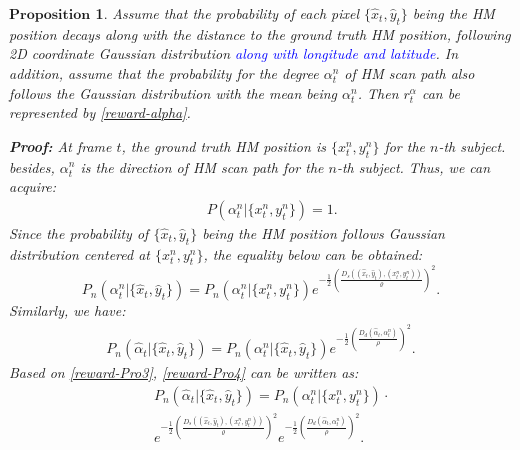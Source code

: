 \documentclass[10pt,journal,compsoc]{IEEEtran}
\newtheorem{proposition}[theorem]{$\textbf{Proposition}$}
\begin{document}
\begin{proposition}
    \label{lemma3}
    Assume that the probability of each pixel $\{\hat{x}_{t},\hat{y}_{t}\}$ being the HM position decays along with the distance to the ground truth HM position, following 2D coordinate Gaussian distribution \textcolor{blue}{along with longitude and latitude}.
    In addition, assume that the probability for the degree $\alpha^{n}_{t}$ of HM scan path also follows the Gaussian distribution with the mean being $\alpha^{n}_{t}$.
    Then $r^{\alpha}_t$ can be represented by \eqref{reward-alpha}.

    \textbf{Proof:} At frame $t$, the ground truth HM position is $\{x^{n}_{t},y^{n}_{t} \}$ for  the $n$-th subject.
    besides, $\alpha^{n}_{t}$ is the direction of HM scan path for the $n$-th subject.
    Thus, we can acquire:
    \begin{eqnarray}
        \label{reward-Pro1}
        && P(\alpha^{n}_{t}|\{x^{n}_{t}, y^{n}_{t}\}) = 1.
    \end{eqnarray}
    Since the probability of $\{\hat{x}_{t},\hat{y}_{t}\}$ being the HM position follows Gaussian distribution centered at $\{x^{n}_{t},y^{n}_{t} \}$, the equality below can be obtained:
    \begin{equation}
        \label{reward-Pro3}
        P_{n}(\alpha^{n}_{t}|\{\hat{x}_{t},\hat{y}_{t}\}) = P_{n}(\alpha^{n}_{t}|\{x^{n}_{t}, y^{n}_{t}\}) e^{-\frac{1}{2}\left(\frac{D_s((\hat{x}_{t},\hat{y}_{t}),(x^n_{t},y^n_{t}))}{\varrho}\right)^2}.
    \end{equation}
    Similarly, we have:
    \begin{eqnarray}
        \label{reward-Pro4}
        P_{n}(\hat{\alpha}_{t}|\{\hat{x}_{t},\hat{y}_{t}\}) = P_{n}(\alpha^{n}_{t}|\{\hat{x}_{t},\hat{y}_{t}\}) e^{-\frac{1}{2}\left(\frac{D_d(\hat{\alpha}_{t}, \alpha^n_{t})}{\rho}\right)^2}.
    \end{eqnarray}
    Based on \eqref{reward-Pro3}, \eqref{reward-Pro4} can be written as:
    \begin{eqnarray}
        \label{reward-Pro5}
        \nonumber && P_{n}(\hat{\alpha}_{t}|\{\hat{x}_{t},\hat{y}_{t}\}) = P_{n}(\alpha^{n}_{t}|\{x^{n}_{t}, y^{n}_{t}\}) \cdot \\ && e^{-\frac{1}{2}\left(\frac{D_s((\hat{x}_{t},\hat{y}_{t}),(x^n_{t},y^n_{t}))}{\varrho}\right)^2}
        e^{-\frac{1}{2}\left(\frac{D_d(\hat{\alpha}_{t}, \alpha^n_{t})}{\rho}\right)^2}.
    \end{eqnarray}

\end{proposition}
\end{document}

